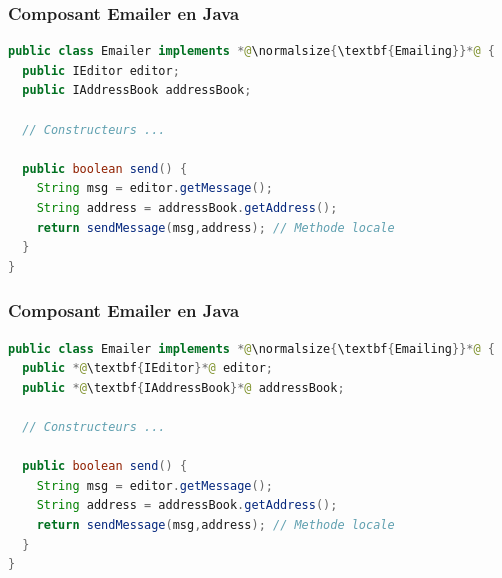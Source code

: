 \documentclass{beamer}
\begin{document}
\begin{frame}[fragile]
  \frametitle{Composant Emailer en Java}

\begin{lstlisting}[language=Java]
public class Emailer implements *@\normalsize{\textbf{Emailing}}*@ {
  public IEditor editor;
  public IAddressBook addressBook;
  
  // Constructeurs ...

  public boolean send() {
    String msg = editor.getMessage();
    String address = addressBook.getAddress();
    return sendMessage(msg,address); // Methode locale
  }
}
\end{lstlisting}
\end{frame}

\begin{frame}[fragile]
  \frametitle{Composant Emailer en Java}

\begin{lstlisting}[language=Java]
public class Emailer implements *@\normalsize{\textbf{Emailing}}*@ {
  public *@\textbf{IEditor}*@ editor;
  public *@\textbf{IAddressBook}*@ addressBook;
  
  // Constructeurs ...

  public boolean send() {
    String msg = editor.getMessage();
    String address = addressBook.getAddress();
    return sendMessage(msg,address); // Methode locale
  }
}
\end{lstlisting}
\end{frame}
\end{document}

